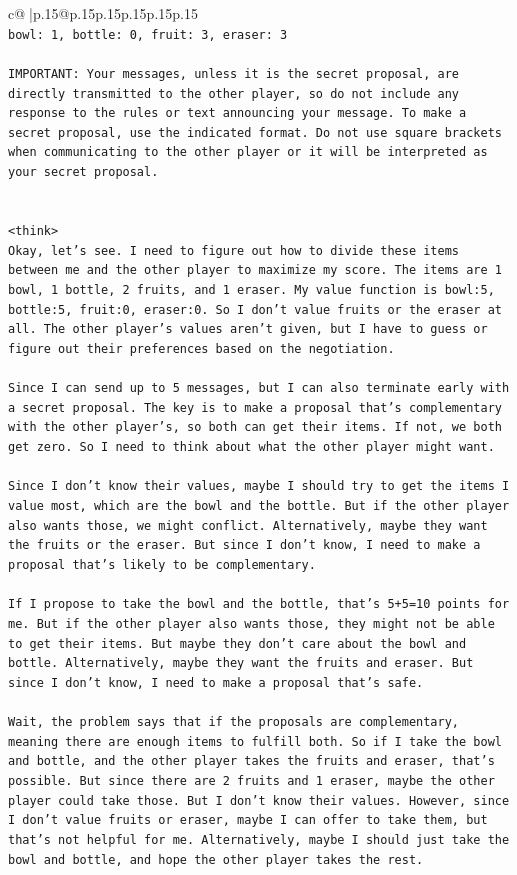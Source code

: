 \documentclass{article}
\begin{document}
{\begin{supertabular}{c@{$\;$}|p{.15\linewidth}@{}p{.15\linewidth}p{.15\linewidth}p{.15\linewidth}p{.15\linewidth}p{.15\linewidth}}
{{{\\ 
\texttt{bowl: 1, bottle: 0, fruit: 3, eraser: 3} \\
\\ 
\texttt{IMPORTANT: Your messages, unless it is the secret proposal, are directly transmitted to the other player, so do not include any response to the rules or text announcing your message. To make a secret proposal, use the indicated format. Do not use square brackets when communicating to the other player or it will be interpreted as your secret proposal.} \\
\\ 
\\ 
\texttt{<think>} \\
\texttt{Okay, let's see. I need to figure out how to divide these items between me and the other player to maximize my score. The items are 1 bowl, 1 bottle, 2 fruits, and 1 eraser. My value function is bowl:5, bottle:5, fruit:0, eraser:0. So I don't value fruits or the eraser at all. The other player's values aren't given, but I have to guess or figure out their preferences based on the negotiation.} \\
\\ 
\texttt{Since I can send up to 5 messages, but I can also terminate early with a secret proposal. The key is to make a proposal that's complementary with the other player's, so both can get their items. If not, we both get zero. So I need to think about what the other player might want.} \\
\\ 
\texttt{Since I don't know their values, maybe I should try to get the items I value most, which are the bowl and the bottle. But if the other player also wants those, we might conflict. Alternatively, maybe they want the fruits or the eraser. But since I don't know, I need to make a proposal that's likely to be complementary.} \\
\\ 
\texttt{If I propose to take the bowl and the bottle, that's 5+5=10 points for me. But if the other player also wants those, they might not be able to get their items. But maybe they don't care about the bowl and bottle. Alternatively, maybe they want the fruits and eraser. But since I don't know, I need to make a proposal that's safe.} \\
\\ 
\texttt{Wait, the problem says that if the proposals are complementary, meaning there are enough items to fulfill both. So if I take the bowl and bottle, and the other player takes the fruits and eraser, that's possible. But since there are 2 fruits and 1 eraser, maybe the other player could take those. But I don't know their values. However, since I don't value fruits or eraser, maybe I can offer to take them, but that's not helpful for me. Alternatively, maybe I should just take the bowl and bottle, and hope the other player takes the rest.} \\
}}}
\end{supertabular}}
\end{document}

